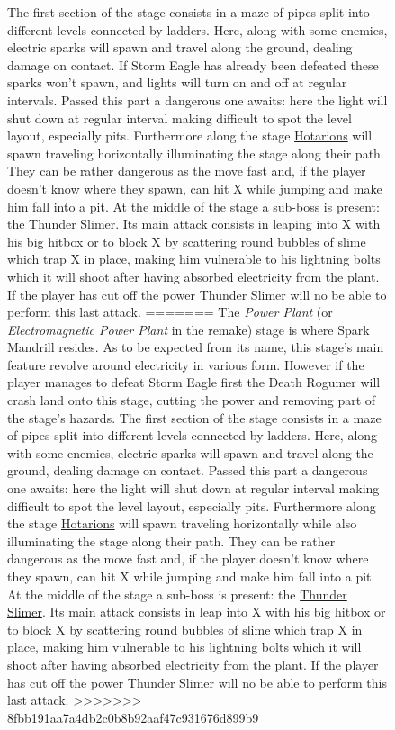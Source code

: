 \begin{figure}[htp]
The first section of the stage consists in a maze of pipes split into different levels connected by ladders. Here, along with some enemies, electric sparks will spawn and travel along the ground, dealing damage on contact. If Storm Eagle has already been defeated these sparks won't spawn, and lights will turn on and off at regular intervals. Passed this part a dangerous one awaits: here the light will shut down at regular interval making difficult to spot the level layout, especially pits. Furthermore along the stage  \hyperlink{enem:Hotarion}{Hotarions} will spawn traveling horizontally illuminating the stage along their path. They can be rather dangerous as the move fast and, if the player doesn't know where they spawn, can hit X while jumping and make him fall into a pit.
At the middle of the stage a sub-boss is present: the \hyperlink{miniboss:Thunder_slimer}{Thunder Slimer}. Its main attack consists in leaping into X with his big hitbox or to block X by scattering round bubbles of slime which trap X in place, making him vulnerable to his lightning bolts which it will shoot after having absorbed electricity from the plant. If the player has cut off the power Thunder Slimer will no be able to perform this last attack.
=======
The \textit{Power Plant} (or \textit{Electromagnetic Power Plant} in the remake) stage is where Spark Mandrill resides. As to be expected from its name, this stage's main feature revolve around electricity in various form. However if the player manages to defeat Storm Eagle first the Death Rogumer will crash land onto this stage, cutting the power and removing part of the stage's hazards. 
The first section of the stage consists in a maze of pipes split into different levels connected by ladders. Here, along with some enemies, electric sparks will spawn and travel along the ground, dealing damage on contact. Passed this part a dangerous one awaits: here the light will shut down at regular interval making difficult to spot the level layout, especially pits. Furthermore along the stage  \hyperlink{enem:Hotarion}{Hotarions} will spawn traveling horizontally while also illuminating the stage along their path. They can be rather dangerous as the move fast and, if the player doesn't know where they spawn, can hit X while jumping and make him fall into a pit.
At the middle of the stage a sub-boss is present: the \hyperlink{miniboss:Thunder_slimer}{Thunder Slimer}. Its main attack consists in leap into X with his big hitbox or to block X by scattering round bubbles of slime which trap X in place, making him vulnerable to his lightning bolts which it will shoot after having absorbed electricity from the plant. If the player has cut off the power Thunder Slimer will no be able to perform this last attack.
>>>>>>> 8fbb191aa7a4db2c0b8b92aaf47c931676d899b9


\end{figure}
